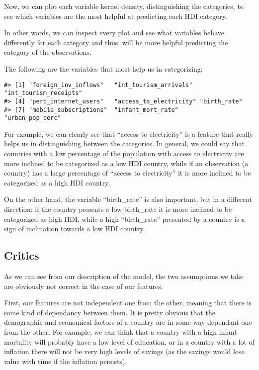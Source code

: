 \documentclass[]{article}
\begin{document}
Now, we can plot each variable kernel density, distinguishing the
categories, to see which variables are the most helpful at predicting
each HDI category.

In other words, we can inspect every plot and see what variables behave
differently for each category and thus, will be more helpful predicting
the category of the observations.

The following are the variables that most help us in categorizing:

\begin{verbatim}
#> [1] "foreign_inv_inflows"   "int_tourism_arrivals"  "int_tourism_receipts" 
#> [4] "perc_internet_users"   "access_to_electricity" "birth_rate"           
#> [7] "mobile_subscriptions"  "infant_mort_rate"      "urban_pop_perc"
\end{verbatim}

For example, we can clearly see that ``access to electricity'' is a
feature that really helps us in distinguishing between the categories.
In general, we could say that countries with a low percentage of the
population with access to electricity are more inclined to be
categorized as a low HDI country, while if an observation (a country)
has a large percentage of ``access to electricity'' it is more inclined
to be categorized as a high HDI country.

On the other hand, the variable ``birth\_rate'' is also important, but
in a different direction: if the country presents a low birth\_rate it
is more inclined to be categorized as high HDI, while a high
``birth\_rate'' presented by a country is a sign of inclination towards
a low HDI country.

\hypertarget{critics}{%
\subsection{Critics}\label{critics}}

As we can see from our description of the model, the two assumptions we
take are obviously not correct in the case of our features.

First, our features are not independent one from the other, meaning that
there is some kind of dependancy between them. It is pretty obvious that
the demographic and economical factors of a country are in some way
dependant one from the other. For example, we can think that a country
with a high infant mortality will probably have a low level of
education, or in a country with a lot of inflation there will not be
very high levels of savings (as the savings would lose value with time
if the inflation persists).
\end{document}
